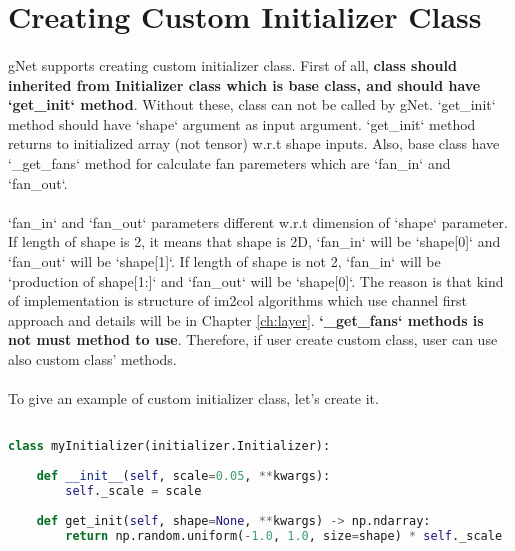 \documentclass[12pt]{report}
\begin{document}
\section{Creating Custom Initializer Class}

\paragraph{}
gNet supports creating custom initializer class. First of all, \textbf{class should inherited from Initializer class which is base class, and should have `get\_init` method}. Without these, class can not be called by gNet. `get\_init` method should have `shape` argument as input argument. `get\_init` method returns to initialized array (not tensor) w.r.t shape inputs. Also, base class have `\_get\_fans` method for calculate fan paremeters which are `fan\_in` and `fan\_out`. 

\paragraph{}
`fan\_in` and `fan\_out` parameters different w.r.t dimension of `shape` parameter. If length of shape is 2, it means that shape is 2D, `fan\_in` will be `shape[0]` and `fan\_out` will be `shape[1]`. If length of shape is not 2, `fan\_in` will be `production of shape[1:]` and `fan\_out` will be `shape[0]`. The reason is that kind of implementation is structure of im2col algorithms which use channel first approach and details will be in Chapter \ref{ch:layer}. \textbf{`\_get\_fans` methods is not must method to use}. Therefore, if user create custom class, user can use also custom class' methods. 

\paragraph{}
To give an example of custom initializer class, let's create it. 


\begin{lstlisting}[language=Python, numbers=none, caption={Custom initializer class.}, label={lis:initializer-custom-class}]

class myInitializer(initializer.Initializer):
 
	def __init__(self, scale=0.05, **kwargs):
		self._scale = scale
		
	def get_init(self, shape=None, **kwargs) -> np.ndarray:   
		return np.random.uniform(-1.0, 1.0, size=shape) * self._scale

\end{lstlisting}
\end{document}
